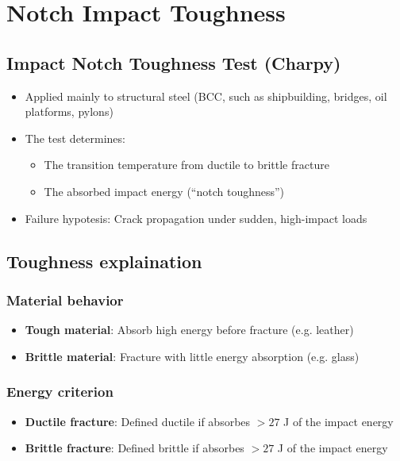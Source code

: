 \documentclass{article}
\begin{document}
\newpage
\section{Notch Impact Toughness}
\subsection{Impact Notch Toughness Test (Charpy)}
\begin{itemize}
  \item Applied mainly to structural steel (BCC, such as shipbuilding, bridges, oil platforms, pylons)
  \item The test determines:
  \begin{itemize}
    \item The transition temperature from ductile to brittle fracture
    \item The absorbed impact energy (``notch toughness'')
  \end{itemize}
  \item Failure hypotesis: Crack propagation under sudden, high-impact loads
\end{itemize}

\subsection{Toughness explaination}
\subsubsection{Material behavior}
\begin{itemize}
  \item \textbf{Tough material}: Absorb high energy before fracture (e.g. leather)
  \item \textbf{Brittle material}: Fracture with little energy absorption (e.g. glass)
\end{itemize}

\subsubsection{Energy criterion}
\begin{itemize}
  \item \textbf{Ductile fracture}: Defined ductile if absorbes $> 27$ J of the impact energy
  \item \textbf{Brittle fracture}: Defined brittle if absorbes $> 27$ J of the impact energy
\end{itemize}
\end{document}
